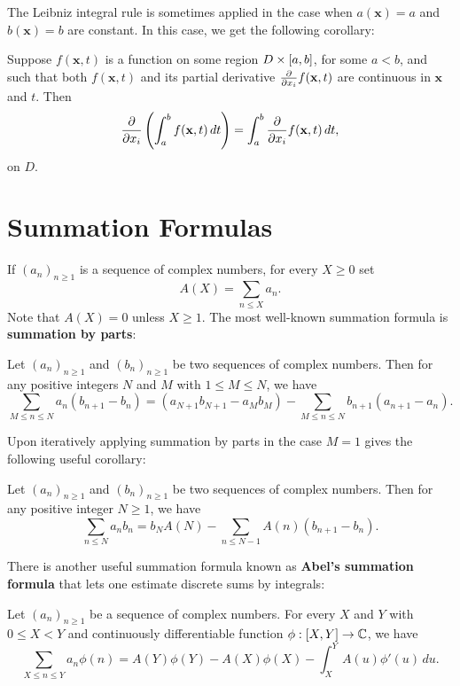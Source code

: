     The Leibniz integral rule is sometimes applied in the case when $a(\mathbf{x}) = a$ and $b(\mathbf{x}) = b$ are constant. In this case, we get the following corollary:

    \begin{corollary}
      Suppose $f(\mathbf{x},t)$ is a function on some region $D \times [a,b]$, for some $a < b$, and such that both $f(\mathbf{x},t)$ and its partial derivative $\frac{\partial}{\partial x_{i}}f(\mathbf{x},t)$ are continuous in $\mathbf{x}$ and $t$. Then
      \[
        \frac{\partial}{\partial x_{i}}\left(\int_{a}^{b}f(\mathbf{x},t)\,dt\right) = \int_{a}^{b}\frac{\partial}{\partial x_{i}}f(\mathbf{x},t)\,dt,
      \]
      on $D$.
    \end{corollary}
  \section{Summation Formulas}\label{append:Summation_Formulas}
    If $(a_{n})_{n \ge 1}$ is a sequence of complex numbers, for every $X \ge 0$ set
    \[
        A(X) = \sum_{n \le X}a_{n}.
    \]
    Note that $A(X) = 0$ unless $X \ge 1$. The most well-known summation formula is \textbf{summation by parts}:

    \begin{theorem}
      Let $(a_{n})_{n \ge 1}$ and $(b_{n})_{n \ge 1}$ be two sequences of complex numbers. Then for any positive integers $N$ and $M$ with $1 \le M \le N$, we have
      \[
        \sum_{M \le n \le N}a_{n}(b_{n+1}-b_{n}) = (a_{N+1}b_{N+1}-a_{M}b_{M})-\sum_{M \le n \le N}b_{n+1}(a_{n+1}-a_{n}).
      \]
    \end{theorem}

    Upon iteratively applying summation by parts in the case $M = 1$ gives the following useful corollary:

    \begin{corollary}\label{cor:summation_by_parts_corollary}
      Let $(a_{n})_{n \ge 1}$ and $(b_{n})_{n \ge 1}$ be two sequences of complex numbers. Then for any positive integer $N \ge 1$, we have
      \[
        \sum_{n \le N}a_{n}b_{n} = b_{N}A(N)-\sum_{n \le N-1}A(n)(b_{n+1}-b_{n}).
      \]
    \end{corollary}
    
    There is another useful summation formula known as \textbf{Abel's summation formula} that lets one estimate discrete sums by integrals:

    \begin{theorem}
      Let $(a_{n})_{n \ge 1}$ be a sequence of complex numbers. For every $X$ and $Y$ with $0 \le X < Y$ and continuously differentiable function $\phi:[X,Y] \to \mathbb{C}$, we have
      \[
        \sum_{X \le n \le Y}a_{n}\phi(n) = A(Y)\phi(Y)-A(X)\phi(X)-\int_{X}^{Y}A(u)\phi'(u)\,du.
      \]
    \end{theorem}

